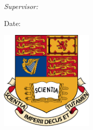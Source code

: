 \begin{titlepage}
\begin{flushleft}
\vspace{5mm}

\textit{Supervisor:}\\
\hspace{2mm} \reportsupervisor
\end{flushleft}
\vspace{6mm}
\makeatletter
Date: \@date\\

\vspace*{\fill} %
{
\begin{center}
	\vspace{1.5cm}
	\includegraphics[width = 4.5cm]{ICL-crest.pdf}\\
\end{center}

}
\vspace*{\fill} 
\clearpage %


\makeatother


\end{titlepage}


